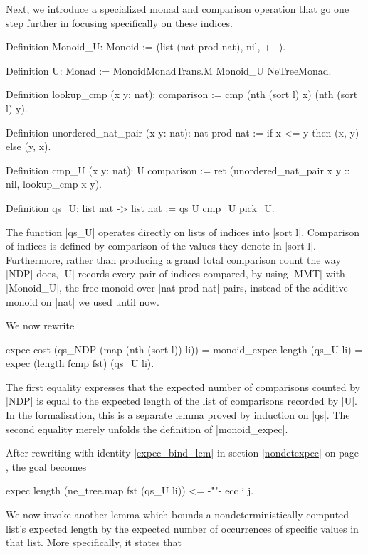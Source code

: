 \documentclass[runningheads]{llncs}
\begin{document}
Next, we introduce a specialized monad and comparison operation that go one step further in focusing specifically on these indices.
\begin{code}
  Definition Monoid_U: Monoid := (list (nat prod nat), nil, ++).

  Definition U: Monad := MonoidMonadTrans.M Monoid_U NeTreeMonad.

  Definition lookup_cmp (x y: nat): comparison :=
    cmp (nth (sort l) x) (nth (sort l) y).

  Definition unordered_nat_pair (x y: nat): nat prod nat :=
    if x <= y then (x, y) else (y, x).

  Definition cmp_U (x y: nat): U comparison :=
    ret (unordered_nat_pair x y :: nil, lookup_cmp x y).

  Definition qs_U: list nat -> list nat := qs U cmp_U pick_U.
\end{code}
The function |qs_U| operates directly on lists of indices into |sort l|. Comparison of indices is defined by comparison of the %
values they denote in |sort l|. Furthermore, rather than producing a grand total comparison count the way |NDP| does, |U| records every pair of indices compared, by using |MMT| with |Monoid_U|, the free monoid over |nat prod nat| pairs, instead of the additive monoid on |nat| we used until now.

We now rewrite
\begin{code}expec cost (qs_NDP (map (nth (sort l)) li))
  = monoid_expec length (qs_U li) = expec (length fcmp fst) (qs_U li).
\end{code}
The first equality expresses that the expected number of comparisons counted by |NDP| is equal to the expected length of the list of comparisons recorded by |U|. In the formalisation, this is a separate lemma proved by induction on |qs|. The second equality merely unfolds the definition of |monoid_expec|.

After rewriting with identity \ref{expec_bind_lem} in section \ref{nondetexpec} on page \pageref{expec_bind_lem}, the goal becomes
\begin{code}
  expec length (ne_tree.map fst (qs_U li)) <= {-""-} ecc i j.
\end{code}
We now invoke another lemma which bounds a nondeterministically computed list's expected length by the expected number of occurrences of specific values in that list. More specifically, it states that
\end{document}
